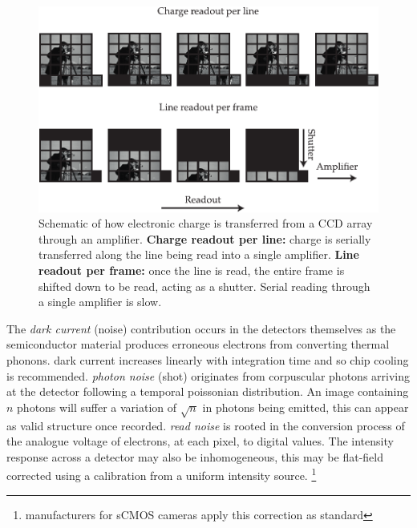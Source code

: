 \begin{figure}
    \centering
    \includegraphics{./sensor_chips}
    \caption{Schematic of how electronic charge is transferred from a \gls{CCD} array through an amplifier.
    \textbf{Charge readout per line:} charge is serially transferred along the line being read into a single amplifier.
    \textbf{Line readout per frame:} once the line is read, the entire frame is shifted down to be read, acting as a shutter.
    Serial reading through a single amplifier is slow.}
    \label{fig:sensor_chips}
\end{figure}

The \emph{\gls{dark current}} (noise) contribution occurs in the detectors themselves as the semiconductor material produces erroneous electrons from converting thermal phonons.
\Gls{dark current} increases linearly with integration time and so chip cooling is recommended.
\emph{\Gls{photon noise}} (shot) originates from corpuscular photons arriving at the detector following a temporal \Gls{poissonian distribution}.
An image containing $n$ photons will suffer a variation of $\sqrt{n}$ in photons being emitted, this can appear as valid structure once recorded.
\emph{\Gls{read noise}} is rooted in the conversion process of the analogue voltage of electrons, at each \gls{pixel}, to digital values.
The intensity response across a detector may also be inhomogeneous, this may be flat-field corrected using a calibration from a uniform intensity source.
\footnote{manufacturers for \gls{sCMOS} cameras apply this correction as standard}



